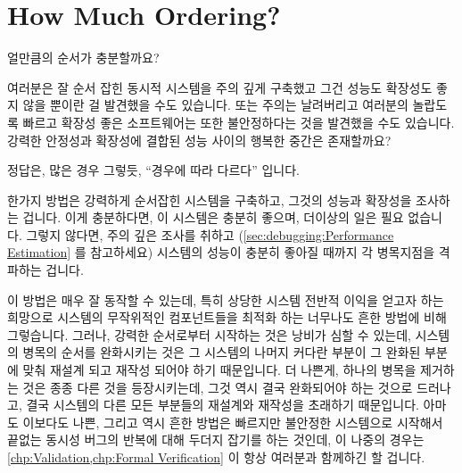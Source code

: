 
\section{How Much Ordering?}
\label{sec:app:questions:How Much Ordering?}

얼만큼의 순서가 충분할까요?

여러분은 잘 순서 잡힌 동시적 시스템을 주의 깊게 구축했고 그건 성능도 확장성도
좋지 않을 뿐이란 걸 발견했을 수도 있습니다.
또는 주의는 날려버리고 여러분의 놀랍도록 빠르고 확장성 좋은 소프트웨어는 또한
불안정하다는 것을 발견했을 수도 있습니다.
강력한 안정성과 확장성에 결합된 성능 사이의 행복한 중간은 존재할까요?

정답은, 많은 경우 그렇듯, ``경우에 따라 다르다'' 입니다.

\iffalse

How much ordering is enough?

Perhaps you have carefully constructed a strongly ordered concurrent
system, only to find that it neither performs nor scales well.
Or perhaps you threw caution to the wind, only to find that your
brilliantly fast and scalable software is also unreliable.
Is there a happy medium with both robust reliability on the one
hand and powerful performance augmented by scintellating scalability on
the other?

The answer, as is so often the case, is ``it depends''.

\fi

한가지 방법은 강력하게 순서잡힌 시스템을 구축하고, 그것의 성능과 확장성을
조사하는 겁니다.
이게 충분하다면, 이 시스템은 충분히 좋으며, 더이상의 일은 필요 없습니다.
그렇지 않다면, 주의 깊은 조사를 취하고
(\cref{sec:debugging:Performance Estimation} 를 참고하세요)
시스템의 성능이 충분히 좋아질 때까지 각 병목지점을 격파하는 겁니다.

이 방법은 매우 잘 동작할 수 있는데, 특히 상당한 시스템 전반적 이익을 얻고자
하는 희망으로 시스템의 무작위적인 컴포넌트들을 최적화 하는 너무나도 흔한 방법에
비해 그렇습니다.
그러나, 강력한 순서로부터 시작하는 것은 낭비가 심할 수 있는데, 시스템의 병목의
순서를 완화시키는 것은 그 시스템의 나머지 커다란 부분이 그 완화된 부분에 맞춰
재설계 되고 재작성 되어야 하기 때문입니다.
더 나쁜게, 하나의 병목을 제거하는 것은 종종 다른 것을 등장시키는데, 그것 역시
결국 완화되어야 하는 것으로 드러나고, 결국 시스템의 다른 모든 부분들의 재설계와
재작성을 초래하기 때문입니다.
아마도 이보다도 나쁜, 그리고 역시 흔한 방법은 빠르지만 불안정한 시스템으로
시작해서 끝없는 동시성 버그의 반복에 대해 두더지 잡기를 하는 것인데, 이 나중의
경우는
\cref{chp:Validation,chp:Formal Verification}
이 항상 여러분과 함께하긴 할 겁니다.

